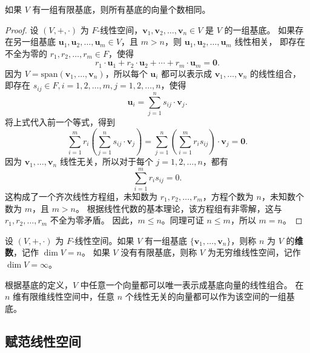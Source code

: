 \begin{proposition}
    如果 $ V $ 有一组有限基底，则所有基底的向量个数相同。
\end{proposition}
\begin{proof}
    设 $ (V,+,\cdot) $ 为 $ F $-线性空间，$ \mathbf{v}_1,\mathbf{v}_2,\ldots,\mathbf{v}_n\in V $ 是 $ V $ 的一组基底。
    如果存在另一组基底 $ \mathbf{u}_1,\mathbf{u}_2,\ldots,\mathbf{u}_m\in V $，且 $ m>n $，则 $\mathbf{u}_1,\mathbf{u}_2,\ldots,\mathbf{u}_m$ 线性相关，
    即存在不全为零的 $ r_1,r_2,\ldots,r_m\in F $，使得
    \[
        r_1\cdot \mathbf{u}_1 + r_2\cdot \mathbf{u}_2 + \cdots + r_m\cdot \mathbf{u}_m = \mathbf{0}.
    \]
    因为 $ V=\mathrm{span}(\mathbf{v}_1,\ldots,\mathbf{v}_n) $，所以每个 $\mathbf{u}_i$ 都可以表示成 $\mathbf{v}_1,\ldots,\mathbf{v}_n$ 的线性组合，
    即存在 $ s_{ij}\in F, i=1,2,\ldots,m, j=1,2,\ldots,n $，使得
    \[
        \mathbf{u}_i = \sum_{j=1}^{n} s_{ij}\cdot \mathbf{v}_j.
    \]
    将上式代入前一个等式，得到
    \[
        \sum_{i=1}^{m} r_i \left( \sum_{j=1}^{n} s_{ij}\cdot \mathbf{v}_j \right) = \sum_{j=1}^{n} \left( \sum_{i=1}^{m} r_i s_{ij} \right) \cdot \mathbf{v}_j = \mathbf{0}.
    \]
    因为 $\mathbf{v}_1,\ldots,\mathbf{v}_n$ 线性无关，所以对于每个 $ j=1,2,\ldots,n $，都有
    \[
        \sum_{i=1}^{m} r_i s_{ij} = 0.
    \]
    这构成了一个齐次线性方程组，未知数为 $ r_1,r_2,\ldots,r_m $，方程个数为 $ n $，未知数个数为 $ m $，且 $ m>n $。
    根据线性代数的基本理论，该方程组有非零解，这与 $ r_1,r_2,\ldots,r_m $ 不全为零矛盾。
    因此，$ m\leq n $。同理可证 $ n\leq m $，所以 $ m=n $。
\end{proof}
\vspace{0.5em}

\begin{definition}
    设 $ (V,+,\cdot) $ 为 $ F $-线性空间。如果 $ V $ 有一组基底 $ \{\mathbf{v}_1,\ldots,\mathbf{v}_n\} $，则称 $ n $ 为 $ V $ 的\textbf{维数}，记作 $\dim V = n$。
    如果 $ V $ 没有有限基底，则称 $ V $ 为无穷维线性空间，记作 $\dim V = \infty$。
\end{definition}

\begin{note}
    根据基底的定义，$V$ 中任意一个向量都可以唯一表示成基底向量的线性组合。
    在 $n$ 维有限维线性空间中，任意 $n$ 个线性无关的向量都可以作为该空间的一组基底。
\end{note}
\vspace{1em}

\subsection{赋范线性空间}

